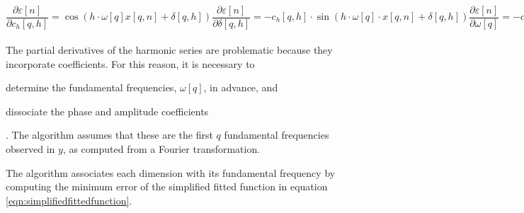 \documentclass{article}
\begin{document}
\begin{subequations}
\label{eqn:partialderivativeexpansions}
\begin{equation}
\frac{\partial \varepsilon\left[ n \right]}{\partial c_h\left[q, h\right]} = \cos\left( h \cdot \omega\left[q\right] x\left[q, n\right] + \delta\left[q, h\right] \right)
\end{equation}
\begin{equation}
\label{eqn:phasepartialderivativeexpansion}
\frac{\partial \varepsilon\left[ n \right]}{\partial \delta\left[q, h\right]} = - c_h\left[q, h\right] \cdot \sin\left(h \cdot \omega\left[q\right] \cdot x\left[q, n \right] + \delta\left[q, h\right]\right)
\end{equation}
\begin{equation}
\frac{\partial \varepsilon\left[ n \right]}{\partial \omega\left[q\right]} = - c_h\left[q, h\right] \cdot h \cdot x\left[q, i \right] \cdot \sin\left(h \cdot \omega\left[q\right] \cdot x\left[q, i \right] + \delta\left[q, h\right]\right)
\end{equation}
\begin{equation}
\frac{\partial \varepsilon\left[ n \right]}{\partial c_p\left[q, p\right]} = \left\{\begin{array}{ccc}p = 0&:&1\\p\ne0&:&p \cdot \left( x\left[q, n \right] \right)^{\left( p - 1 \right)}\end{array}\right.
\end{equation}
\end{subequations}

\par{The partial derivatives of the harmonic series are problematic because they incorporate coefficients. For this reason, it is necessary to \begin{enumerate*}[label=(\alph*)]\item{determine the fundamental frequencies, $\omega[q]$, in advance, and}\item{dissociate the phase and amplitude coefficients}\end{enumerate*}. The algorithm assumes that these are the first $q$ fundamental frequencies observed in $y$, as computed from a Fourier transformation.}

\par{The algorithm associates each dimension with its fundamental frequency by computing the minimum error of the simplified fitted function in equation \eqref{eqn:simplifiedfittedfunction}.}
\end{document}
